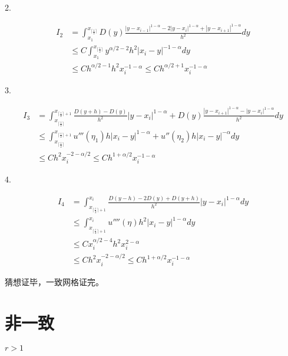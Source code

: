 \documentclass{ctexart}
\begin{document}



2.

\begin{equation}
    \begin{aligned}
        I_2 &= \int_{x_1}^{x_{\lceil \frac{i}{2}\rceil}} D(y) \frac{ |y-x_{i-1}|^{1-\alpha} - 2|y-x_i |^{1-\alpha} + |y-x_{i+1}|^{1-\alpha} }{h^2} dy       \\
        &\le C \int_{x_1}^{x_{\lceil \frac{i}{2}\rceil}} y^{\alpha/2 -2} h^2 |x_i - y |^{-1-\alpha} dy  \\
        &\le C h^{\alpha/2-1} h^2 x_i^{-1-\alpha} \le C h^{\alpha/2+1} x_i^{-1-\alpha}
    \end{aligned}
\end{equation}


3. 


\begin{equation}
    \begin{aligned}
        I_3 & = \int_{x_{\lceil \frac{i}{2}\rceil }}^{x_{\lceil \frac{i}{2}\rceil +1 }} \frac{  D(y+h) - D(y) }{h^2} |y-x_i|^{1-\alpha} + D(y)\frac{ |y-x_{i+1}|^{1-\alpha} - |y-x_{i}|^{1-\alpha} }{h^2} dy \\
        &\le \int_{x_{\lceil \frac{i}{2}\rceil }}^{x_{\lceil \frac{i}{2}\rceil +1 }} u'''(\eta_1) h |x_i-y|^{1-\alpha} + u''(\eta_2) h |x_i-y|^{-\alpha}  dy      \\
        &\le C h^2 x_i^{-2-\alpha/2} \le C h^{1+\alpha/2} x_i^{-1-\alpha}
    \end{aligned}
\end{equation}





4.

\begin{equation}
    \begin{aligned}
        I_4 &= \int_{x_{\lceil \frac{i}{2}\rceil +1}}^{x_{i}} \frac{  D(y-h) -2D(y) +  D(y+h) }{h^2} |y-x_i|^{1-\alpha} dy      \\
        &\le \int_{x_{\lceil \frac{i}{2}\rceil +1}}^{x_{i}} u''''(\eta) h^2 |x_i - y|^{1-\alpha} dy \\
        &\le C x_{i}^{\alpha/2 -4} h^2 x_i^{2-\alpha}       \\
        &\le C h^2 x_i^{-2-\alpha/2} \le C h^{1+\alpha/2} x_i^{-1-\alpha}
    \end{aligned}
\end{equation}


猜想证毕，一致网格证完。


\section{非一致}

\(r > 1\)
\end{document}
